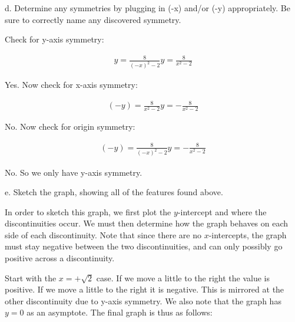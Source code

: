 \documentclass[letterpaper, 12pt]{article}
\begin{document}
d. Determine any symmetries by plugging in (-x) and/or (-y) appropriately. Be
sure to correctly name any discovered symmetry.

\bigskip

Check for y-axis symmetry:

\begin{eqnarray*}
y=\frac{8}{(-x)^2-2}
y=\frac{8}{x^2-2}
\end{eqnarray*}

Yes. Now check for x-axis symmetry:

\begin{eqnarray*}
(-y)=\frac{8}{x^2-2}
y=-\frac{8}{x^2-2}
\end{eqnarray*}

No.  Now check for origin symmetry:

\begin{eqnarray*}
(-y)=\frac{8}{(-x)^2-2}
y=-\frac{8}{x^2-2}
\end{eqnarray*}

No.  So we only have y-axis symmetry.

\bigskip

e. Sketch the graph, showing all of the features found above.

\bigskip

In order to sketch this graph, we first plot the $y$-intercept and where the
discontinuities occur. We must then determine how the graph behaves on each
side of each discontinuity. Note that since there are no $x$-intercepts, the
graph must stay negative between the two discontinuities, and can only possibly
go positive across a discontinuity.

\bigskip

Start with the $x=+\sqrt{2}$ case. If we move a little to the right the value
is positive. If we move a little to the right it is negative. This is mirrored
at the other discontinuity due to y-axis symmetry. We also note that the graph
has $y=0$ as an asymptote. The final graph is thus as follows:
\end{document}
